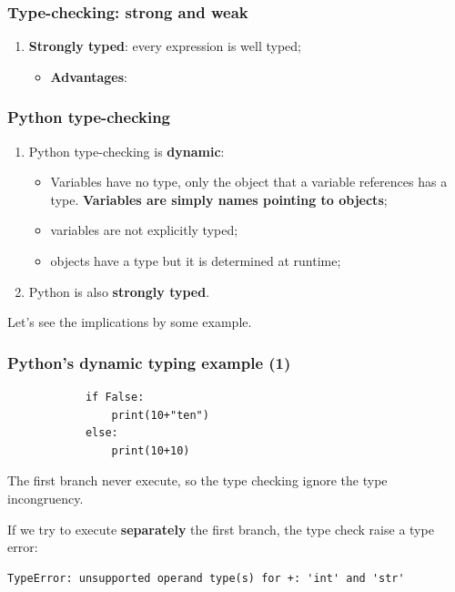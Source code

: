\documentclass[xcolor ={table,usenames,dvipsnames}]{beamer}
\theoremstyle{definition}
\begin{document}
\begin{frame}
	\frametitle{Type-checking: strong and weak}
	\begin{enumerate}
		\item \textbf{Strongly typed}: every expression is well typed;
			\begin{itemize}
				\item \textbf{Advantages}: 
			\end{itemize}
	\end{enumerate}
	
\end{frame}

	\begin{frame}
		\frametitle{Python type-checking}
			\begin{enumerate}
				\item Python type-checking is \textbf{dynamic}: 
				\begin{itemize}
					\item Variables have no type, only the object that a variable references has a type. \textbf{Variables are simply names pointing to objects};
					\item variables are not explicitly typed;
					\item objects have a type but it is determined at runtime;
				\end{itemize}
				\item Python is also \textbf{strongly typed}.
			\end{enumerate}
			
			Let's see the implications by some example.
	\end{frame}

	\begin{frame}[fragile]
		\frametitle{Python's dynamic typing example (1)}
			\begin{lstlisting} 
			if False:
				print(10+"ten") 
			else:
				print(10+10)
			\end{lstlisting}
			The first branch never execute, so the type checking ignore the type incongruency.
			
			If we try to execute \textbf{separately} the first branch, the type check raise a type error:
			
			\begin{lstlisting}[keywordstyle=\color{black},
			commentstyle=\color{black},
			stringstyle=\color{black}.]
			TypeError: unsupported operand type(s) for +: 'int' and 'str'
			\end{lstlisting}
	\end{frame}
\end{document}
